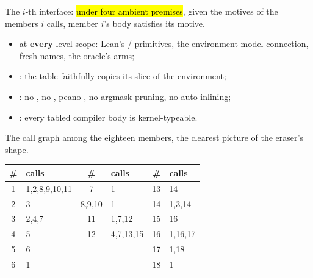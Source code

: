 \begin{definition}
\label{def:Step1}
\leanok
{}
 The $i$-th interface: \hl{under four ambient premises}, given the motives of the members
$i$ calls, member $i$'s body satisfies its motive.
\begin{itemize}
\item {} at \textbf{every} level scope: Lean's / primitives, the
environment-model connection, fresh names, the oracle's arms;
\item {}: the table faithfully copies its slice of the environment;
\item {}: no , no , peano , no argmask pruning,
no auto-inlining;
\item {}: every tabled compiler body is kernel-typeable.
\end{itemize}
\end{definition}

\begin{remark}
 The call graph among the eighteen members, the clearest picture of the eraser's shape.
\begin{center}
\begin{tabular}{cl@{\qquad}cl@{\qquad}cl}
\textbf{\#} & \textbf{calls} & \textbf{\#} & \textbf{calls} & \textbf{\#} & \textbf{calls} \\
\hline
1 & 1,2,8,9,10,11 & 7 & 1 & 13 & 14 \\
2 & 3 & 8,9,10 & 1 & 14 & 1,3,14 \\
3 & 2,4,7 & 11 & 1,7,12 & 15 & 16 \\
4 & 5 & 12 & 4,7,13,15 & 16 & 1,16,17 \\
5 & 6 & & & 17 & 1,18 \\
6 & 1 & & & 18 & 1 \\
\hline
\end{tabular}
\end{center}
\end{remark}

